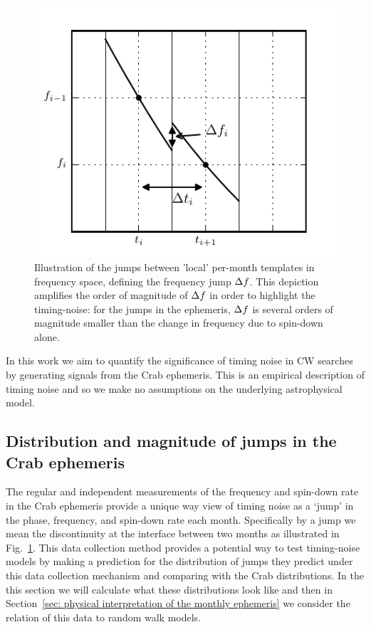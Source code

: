 \documentclass[../full_thesis/full_thesis.tex]{subfiles}
\begin{document}
\begin{figure}[htb]
\centering
    \includegraphics{template_jumps}
\caption{Illustration of the jumps between 'local' per-month templates in
    frequency space, defining the frequency jump $\Delta f$. This
        depiction amplifies the order of magnitude of $\Delta f$ in order to
        highlight the timing-noise: for the jumps in the ephemeris, $\Delta f$
        is several orders of magnitude smaller than the change in frequency
        due to spin-down alone.}
\label{fig: template jumps}
\end{figure}

In this work we aim to quantify the significance of timing
noise in CW searches by generating signals from the Crab ephemeris. This
is an empirical description of timing noise and so we
make no assumptions on the underlying astrophysical model.

\subsection{Distribution and magnitude of jumps in the Crab ephemeris}
\label{sec: jumps}

The regular and independent measurements of the frequency and spin-down rate in
the Crab ephemeris provide a unique way view of timing noise as a `jump' in the
phase, frequency, and spin-down rate each month. Specifically by a jump we mean
the discontinuity at the interface between two months as illustrated in
Fig.~\ref{fig: template jumps}.  This data collection method provides a
potential way to test timing-noise models by making a prediction for the
distribution of jumps they predict under this data collection mechanism and
comparing with the Crab distributions. In the this section we will
calculate what these distributions look like and then in Section~\ref{sec:
physical interpretation of the monthly ephemeris} we consider the relation of
this data to random walk models.
\end{document}

